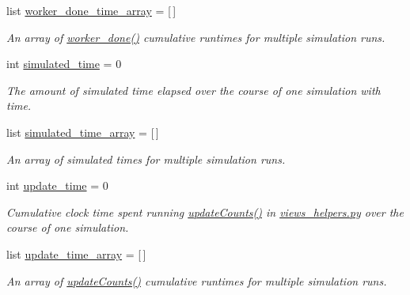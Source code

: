 \begin{DoxyCompactItemize}
list \mbox{\hyperlink{classdynamicfilterapp_1_1test__simulations_1_1_simulation_test_afaec525ce73afa412628498ba8603b65}{worker\+\_\+done\+\_\+time\+\_\+array}} = \mbox{[}$\,$\mbox{]}
\begin{DoxyCompactList}\small\item\em An array of \mbox{\hyperlink{namespacedynamicfilterapp_1_1views__helpers_af27860dfe5bfa6b2b8a1b29347eb918d}{worker\+\_\+done()}} cumulative runtimes for multiple simulation runs. \end{DoxyCompactList}\item 
int \mbox{\hyperlink{classdynamicfilterapp_1_1test__simulations_1_1_simulation_test_a6f5fc01b7113c998fcfc7cb55d4d726e}{simulated\+\_\+time}} = 0
\begin{DoxyCompactList}\small\item\em The amount of simulated time elapsed over the course of one simulation with time. \end{DoxyCompactList}\item 
list \mbox{\hyperlink{classdynamicfilterapp_1_1test__simulations_1_1_simulation_test_ab2666a2c03eb51015003354a03c0f25e}{simulated\+\_\+time\+\_\+array}} = \mbox{[}$\,$\mbox{]}
\begin{DoxyCompactList}\small\item\em An array of simulated times for multiple simulation runs. \end{DoxyCompactList}\item 
int \mbox{\hyperlink{classdynamicfilterapp_1_1test__simulations_1_1_simulation_test_ac218a6f58aae0da542fe9887eb8a6c21}{update\+\_\+time}} = 0
\begin{DoxyCompactList}\small\item\em Cumulative clock time spent running \mbox{\hyperlink{namespacedynamicfilterapp_1_1views__helpers_a57d6ebd6f2f99cba59b82eded490891f}{update\+Counts()}} in \mbox{\hyperlink{views__helpers_8py}{views\+\_\+helpers.\+py}} over the course of one simulation. \end{DoxyCompactList}\item 
list \mbox{\hyperlink{classdynamicfilterapp_1_1test__simulations_1_1_simulation_test_ab4055eae9396bd4aed941b202095d298}{update\+\_\+time\+\_\+array}} = \mbox{[}$\,$\mbox{]}
\begin{DoxyCompactList}\small\item\em An array of \mbox{\hyperlink{namespacedynamicfilterapp_1_1views__helpers_a57d6ebd6f2f99cba59b82eded490891f}{update\+Counts()}} cumulative runtimes for multiple simulation runs. \end{DoxyCompactList}\item 

\end{DoxyCompactItemize}
